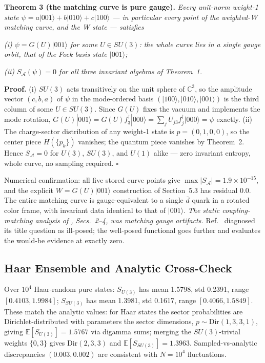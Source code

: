\documentclass[11pt]{article}
\newcommand{\CC}{\mathbb{C}}
\newcommand{\SA}{S_{\mathcal{A}}}
\begin{document}
\medskip

\noindent\textbf{Theorem 3 (the matching curve is pure gauge).} \emph{Every unit-norm weight-1 state $\psi = a|001\rangle + b|010\rangle + c|100\rangle$ --- in particular every point of the weighted-W matching curve, and the W state --- satisfies}

\emph{(i) $\psi = G(U)|001\rangle$ for some $U \in SU(3)$: the whole curve lies in a single gauge orbit, that of the Fock basis state $|001\rangle$;}

\emph{(ii) $\SA(\psi) = 0$ for all three invariant algebras of Theorem~1.}

\textbf{Proof.} (i) $SU(3)$ acts transitively on the unit sphere of $\CC^3$, so the amplitude vector $(c, b, a)$ of $\psi$ in the mode-ordered basis $(|100\rangle, |010\rangle, |001\rangle)$ is the third column of some $U \in SU(3)$. Since $G(U)$ fixes the vacuum and implements the mode rotation, $G(U)|001\rangle = G(U) f_3^\dagger |000\rangle = \sum_j U_{j3} f_j^\dagger |000\rangle = \psi$ exactly. (ii) The charge-sector distribution of any weight-1 state is $p = (0, 1, 0, 0)$, so the center piece $H(\{p_k\})$ vanishes; the quantum piece vanishes by Theorem~2. Hence $\SA = 0$ for $U(3)$, $SU(3)$, and $U(1)$ alike --- zero invariant entropy, whole curve, no sampling required. \hfill$\square$

\medskip

Numerical confirmation: all five stored curve points give $\max |\SA| = 1.9 \times 10^{-15}$, and the explicit $W = G(U)|001\rangle$ construction of Section~5.3 has residual $0.0$. The entire matching curve is gauge-equivalent to a single $\bar d$ quark in a rotated color frame, with invariant data identical to that of $|001\rangle$. \emph{The static coupling-matching analysis of \cite{companion}, Secs.~2--4, was matching gauge artifacts.} Ref.~\cite{companion} diagnosed its title question as ill-posed; the well-posed functional goes further and evaluates the would-be evidence at exactly zero.

\subsection{Haar Ensemble and Analytic Cross-Check}

Over $10^4$ Haar-random pure states: $S_{U(3)}$ has mean 1.5798, std 0.2391, range $[0.4103, 1.9984]$; $S_{SU(3)}$ has mean 1.3981, std 0.1617, range $[0.4066, 1.5849]$. These match the analytic values: for Haar states the sector probabilities are Dirichlet-distributed with parameters the sector dimensions, $p \sim \mathrm{Dir}(1, 3, 3, 1)$, giving $\mathbb{E}[S_{U(3)}] = 1.5767$ via digamma sums; merging the $SU(3)$-trivial weights $\{0, 3\}$ gives $\mathrm{Dir}(2, 3, 3)$ and $\mathbb{E}[S_{SU(3)}] = 1.3963$. Sampled-vs-analytic discrepancies $(0.003, 0.002)$ are consistent with $N = 10^4$ fluctuations.
\end{document}

